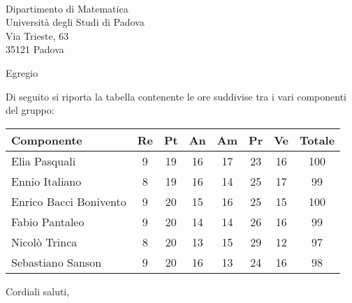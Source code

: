 \documentclass[12pt, boldsubject, italicsignature, noindent]{letteracdp}
\date{}
\begin{document}
\begin{letter}{
        \Vardanega \\
        Dipartimento di Matematica \\
        Università degli Studi di Padova \\
        Via Trieste, 63 \\ 35121 Padova
    }

    \opening{Egregio \vardanega}

    Di seguito si riporta la tabella contenente le ore suddivise tra i vari componenti del gruppo:

    \begin{tabular}{l|cccccc|c}
        \textbf{Componente} & \textbf{Re} & \textbf{Pt} & \textbf{An} & \textbf{Am} & \textbf{Pr} & \textbf{Ve} & \textbf{Totale}\\
        \hline
        Elia Pasquali &	9 &	19 & 16 & 17 & 23 &	16 & 100 \\
        Ennio Italiano & 8 & 19 & 16 & 14 & 25 &	17  & 99\\
        Enrico Bacci Bonivento & 9 & 20 & 15 & 16 &	25 & 15 & 100 \\
        Fabio Pantaleo & 9 & 20 & 14 & 14 &	26 & 16 & 99\\
        Nicolò Trinca &	8 &	20 & 13 & 15 & 29 &	12 & 97\\
        Sebastiano Sanson &	9 &	20 & 16 & 13 & 24 &	16  & 98
    \end{tabular}

    \closing{Cordiali saluti,}

\end{letter}
\end{document}
